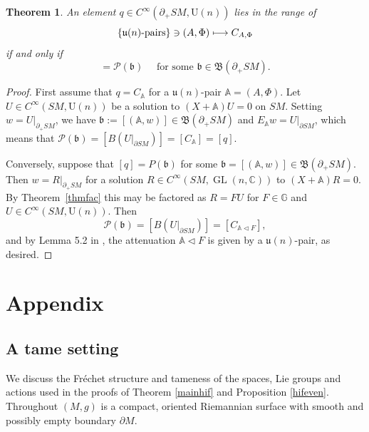 \documentclass[JEP,XML,SOM,Unicode,published]{cedram}
\newcommand\mto{\mathchoice{\longmapsto}{\mapsto}{\mapsto}{\mapsto}}
\DeclareMathOperator{\GL}{GL}
\newcommand{\rU}{\mathrm{U}}
\theoremstyle{plain}
\newtheorem{theorem}{Theorem}[section]
\theoremstyle{definition}
\newcommand{\A}{\mathbb{A}}
\newcommand{\G}{\mathbb{G}}
\newcommand{\C}{\mathbb{C}}
\newcommand{\BB}{\mathfrak{B}}
\renewcommand{\u}{\mathfrak{u}}
\newcommand{\1}{{\bf 1}}
\let\act\triangleleft
\begin{document}
\begin{theorem} An element $q \in C^\infty(\partial_+SM,\rU(n))$ lies in the range of\vspace*{-3pt}
\[
\{\u(n)\text{-pairs}\} \ni (A,\Phi) \mto C_{A,\Phi}
\]
if and only if\vspace*{-3pt}
\begin{equation*}
[q] = \mathcal{P}(\mathfrak{b}) \quad \text{ for some } \mathfrak{b}\in \BB(\partial_+SM).
\end{equation*}
\end{theorem}

\begin{proof} First assume that $q\!=\!C_\A$ for a $\u(n)$-pair $\A\!=\!(A,\Phi)$. Let $U\!\in\! C^\infty(SM,\rU(n))$ be a solution to $(X+\A)U=0$ on $SM$. Setting $w=U\vert_{\partial_+SM}$, we have $\mathfrak{b}:=[(\A,w)]\in \BB(\partial_+SM)$ and $E_\A w = U\vert_{\partial SM}$, which means that $\mathcal{P}(\mathfrak{b})=[B(U\vert_{\partial SM})]=[C_\A]=[q]$.

Conversely, suppose that $[q]=P(\mathfrak{b})$ for some $\mathfrak{b}=[(\A,w)]\in \BB(\partial_+SM)$.
Then $w=R\vert_{\partial_+SM}$ for a solution $R\in C^\infty(SM,\GL(n,\C))$ to $(X+\A)R=0$. By Theorem~\ref{thmfac} this may be factored as $R=FU$ for $F\in \G$ and $U\in C^\infty(SM,\rU(n))$. Then\vspace*{-3pt}
\begin{equation*}
\mathcal{P}(\mathfrak{b})=[B(U\vert_{\partial SM})] = [C_{\A\act F}],
\end{equation*}
and by Lemma 5.2 in \cite{PaSa20}, the attenuation $\A\act F$ is given by a $\u(n)$-pair, as desired.
\end{proof}

\section{Appendix}\label{appendix}

\subsection{A tame setting}\label{tamesetting}

We discuss the Fréchet structure and tameness of the spaces, Lie groups and actions used in the proofs of Theorem \ref{mainhif} and Proposition \ref{hifeven}. Throughout $(M,g)$ is a compact, oriented Riemannian surface with smooth and possibly empty boundary $\partial M$.

\smallskip
\end{document}
